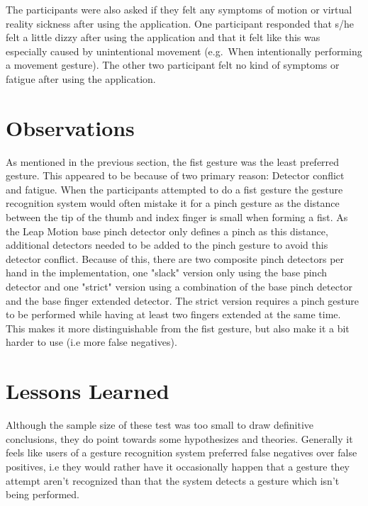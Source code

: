 The participants were also asked if they felt any symptoms of motion or virtual reality sickness after using the application. 
One participant responded that s/he felt a little dizzy after using the application and that it felt like this was especially caused by unintentional movement 
(e.g.~When intentionally performing a movement gesture). The other two participant felt no kind of symptoms or fatigue after using the application.

\section{Observations}
As mentioned in the previous section, the fist gesture was the least preferred gesture.
This appeared to be because of two primary reason: Detector conflict and fatigue.
When the participants attempted to do a fist gesture the gesture recognition system would often mistake it for a pinch gesture 
as the distance between the tip of the thumb and index finger is small when forming a fist. As the Leap Motion base pinch detector only defines a pinch
as this distance, additional detectors needed to be added to the pinch gesture to avoid this detector conflict. Because of this, there are two composite pinch
detectors per hand in the implementation, one "slack" version only using the base pinch detector and one "strict" version using a combination of the base
pinch detector and the base finger extended detector. The strict version requires a pinch gesture to be performed while having at least two fingers extended at the same time. 
This makes it more distinguishable from the fist gesture, but also make it a bit harder to use (i.e more false negatives).



\section{Lessons Learned}

Although the sample size of these test was too small to draw definitive conclusions, they do point towards some hypothesizes and theories. 
Generally it feels like users of a gesture recognition system preferred false negatives over false positives, i.e they would rather have it occasionally
happen that a gesture they attempt aren't recognized than that the system detects a gesture which isn't being performed.





